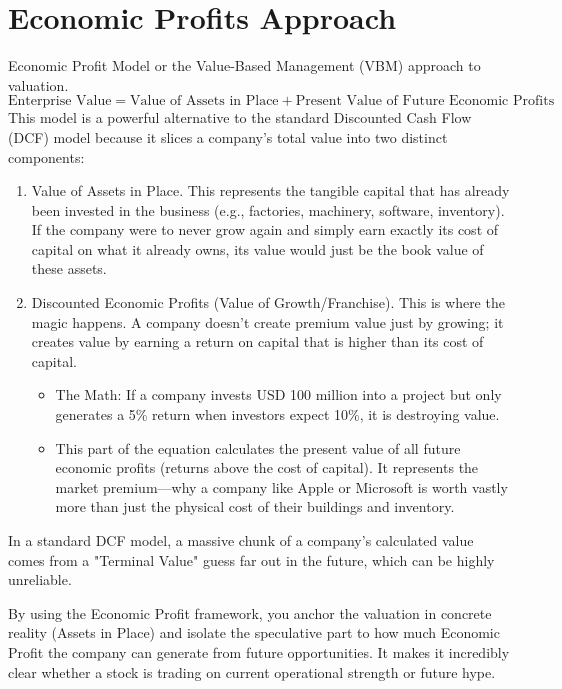 \documentclass[11pt,a4paper]{report}
\begin{document}
\section{Economic Profits Approach}
Economic Profit Model or the Value-Based Management (VBM) approach to valuation.
\begin{equation*}
  \text{Enterprise Value}=\text{Value of Assets in Place}+ \text{Present Value of Future Economic Profits}
\end{equation*}
This model is a powerful alternative to the standard Discounted Cash Flow (DCF) model because it slices a company's total value into two distinct components:
\begin{enumerate}
  \item Value of Assets in Place. This represents the tangible capital that has already been invested in the business (e.g., factories, machinery, software, inventory). If the company were to never grow again and simply earn exactly its cost of capital on what it already owns, its value would just be the book value of these assets.
\item Discounted Economic Profits (Value of Growth/Franchise).
This is where the magic happens. A company doesn't create premium value just by growing; it creates value by earning a return on capital that is higher than its cost of capital.
\begin{itemize}
  \item The Math: If a company invests USD 100 million into a project but only generates a 5\% return when investors expect 10\%, it is destroying value.
  \item This part of the equation calculates the present value of all future economic profits (returns above the cost of capital). It represents the market premium—why a company like Apple or Microsoft is worth vastly more than just the physical cost of their buildings and inventory.
\end{itemize}
\end{enumerate}
In a standard DCF model, a massive chunk of a company's calculated value comes from a "Terminal Value" guess far out in the future, which can be highly unreliable.

By using the Economic Profit framework, you anchor the valuation in concrete reality (Assets in Place) and isolate the speculative part to how much Economic Profit the company can generate from future opportunities. It makes it incredibly clear whether a stock is trading on current operational strength or future hype.
\end{document}
